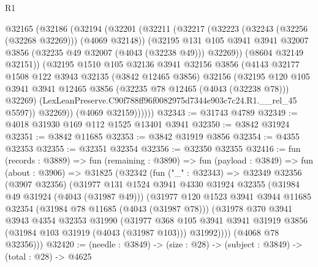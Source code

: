 \begin{lexlean}{R1}
\begin{coremodule}
        @32165
          (@32186
            (@32194
              (@32201
                (@32211
                  (@32217
                    (@32223 (@32243 (@32256 (@32268 @32269))) (@4069 @32148))
                    (@32195
                      @131
                      @105
                      @3941
                      @3941
                      @32007
                      @3856
                      (@32235 @49 @32007 (@4043 (@32238 @49)))
                      @32269))
                  (@8604 @32149 @32151))
                (@32195
                  @1510
                  @105
                  @32136
                  @3941
                  @32156
                  @3856
                  (@4143
                    @32177
                    @1508
                    @122
                    @3943
                    @32135
                    (@3842 @12465 @3856)
                    @32156
                    (@32195
                      @120
                      @105
                      @3941
                      @3941
                      @12465
                      @3856
                      (@32235 @78 @12465 (@4043 (@32238 @78)))
                      @32269)
                    (LexLeanPreserve.C90f788ff96f0082975d7344e903c7c24.R1.__rel_45 @5597))
                  @32269))
              (@4069 @32159))))))
@32343 := @31743 @4789
@32349 := @4018 @31930 @169 @112 @1525 @13401 @3941
@32350 := @3842 @31924
@32351 := @3842 @11685
@32353 := @3842 @31919 @3856
@32354 := @4355 @32353
@32355 := @32351 @32354
@32356 := @32350 @32355
@32416 := fun (records : @3889) =>
  fun (remaining : @3890) =>
  fun (payload : @3849) =>
  fun (about : @3906) =>
  @31825
    (@32342
      (fun ("_" : @32343) =>
      @32349
        @32356
        (@3907 @32356)
        (@31977
          @131
          @1524
          @3941
          @4330
          @31924
          @32355
          (@31984 @49 @31924 (@4043 (@31987 @49)))
          (@31977
            @120
            @1523
            @3941
            @3944
            @11685
            @32354
            (@31984 @78 @11685 (@4043 (@31987 @78)))
            (@31978
              @370
              @3941
              @3943
              @4354
              @32353
              @31990
              (@31977
                @368
                @105
                @3941
                @3941
                @31919
                @3856
                (@31984 @103 @31919 (@4043 (@31987 @103)))
                @31992))))
        (@4068 @78 @32356)))
@32420 := (needle : @3849) -> (size : @28) -> (subject : @3849) -> (total : @28) -> @4625

\end{coremodule}
\end{lexlean}
